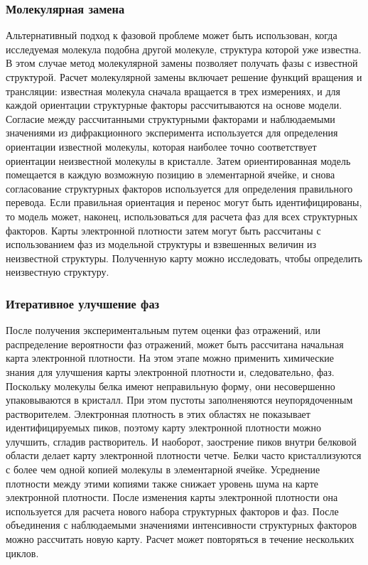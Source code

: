 \documentclass{article}
\begin{document}
\subsubsection{Молекулярная замена}
Альтернативный подход к фазовой проблеме может быть использован, когда исследуемая молекула подобна другой молекуле, структура которой уже известна. В этом случае метод молекулярной замены\cite{MolReplMethod} позволяет получать фазы с известной структурой. Расчет молекулярной замены включает решение функций вращения и трансляции: известная молекула сначала вращается в трех измерениях, и для каждой ориентации структурные факторы рассчитываются на основе модели. Согласие между рассчитанными структурными факторами и наблюдаемыми значениями из дифракционного эксперимента используется для определения ориентации известной молекулы, которая наиболее точно соответствует ориентации неизвестной молекулы в кристалле. Затем ориентированная модель помещается в каждую возможную позицию в элементарной ячейке, и снова согласование структурных факторов используется для определения правильного перевода. Если правильная ориентация и перенос могут быть идентифицированы, то модель может, наконец, использоваться для расчета фаз для всех структурных факторов. Карты электронной плотности затем могут быть рассчитаны с использованием фаз из модельной структуры и взвешенных величин из неизвестной структуры. Полученную карту можно исследовать, чтобы определить неизвестную структуру.
\subsubsection{Итеративное улучшение фаз}
После получения экспериментальным путем оценки фаз отражений, или распределение вероятности фаз отражений, может быть рассчитана начальная карта электронной плотности. На этом этапе можно применить химические знания для улучшения карты электронной плотности и, следовательно, фаз. Поскольку молекулы белка имеют неправильную форму, они несовершенно упаковываются в кристалл. При этом пустоты заполненяются неупорядоченным растворителем. Электронная плотность в этих областях не показывает идентифицируемых пиков, поэтому карту электронной плотности можно улучшить, сгладив растворитель\cite{Wang1985}. И наоборот, заострение пиков внутри белковой области делает карту электронной плотности четче. Белки часто кристаллизуются с более чем одной копией молекулы в элементарной ячейке. Усреднение плотности между этими копиями также снижает уровень шума на карте электронной плотности. После изменения карты электронной плотности она используется для расчета нового набора структурных факторов и фаз. После объединения с наблюдаемыми значениями интенсивности структурных факторов можно рассчитать новую карту. Расчет может повторяться в течение нескольких циклов.
\end{document}
